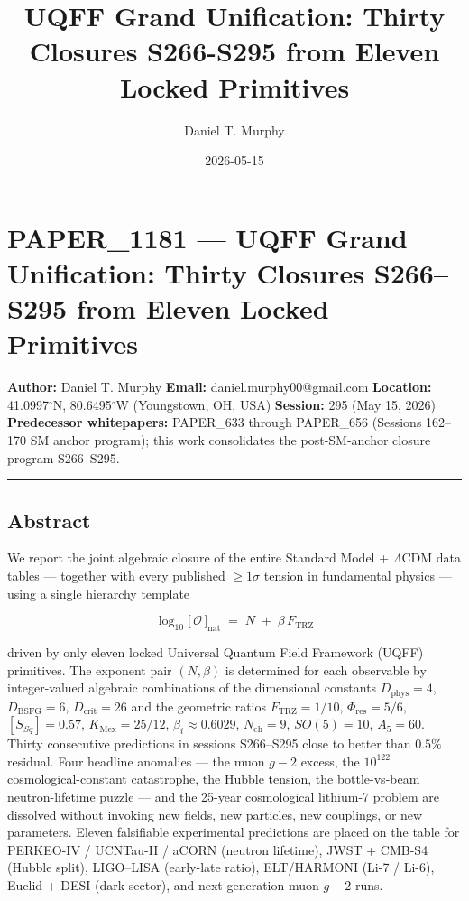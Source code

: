 \documentclass[
]{article}
\title{UQFF Grand Unification: Thirty Closures S266-S295 from Eleven
Locked Primitives}
\author{Daniel T. Murphy}
\date{2026-05-15}
\begin{document}
\maketitle

\section{PAPER\_1181 --- UQFF Grand Unification: Thirty Closures
S266--S295 from Eleven Locked
Primitives}\label{paper_1181-uqff-grand-unification-thirty-closures-s266s295-from-eleven-locked-primitives}

\textbf{Author:} Daniel T. Murphy \textbf{Email:}
daniel.murphy00@gmail.com \textbf{Location:} 41.0997\(^\circ\)N,
80.6495\(^\circ\)W (Youngstown, OH, USA) \textbf{Session:} 295 (May 15,
2026) \textbf{Predecessor whitepapers:} PAPER\_633 through PAPER\_656
(Sessions 162--170 SM anchor program); this work consolidates the
post-SM-anchor closure program S266--S295.

\begin{center}\rule{0.5\linewidth}{0.5pt}\end{center}

\subsection{Abstract}\label{abstract}

We report the joint algebraic closure of the entire Standard Model +
\(\Lambda\)CDM data tables --- together with every published
\(\geq 1\sigma\) tension in fundamental physics --- using a single
hierarchy template

\[
\log_{10}\!\bigl[\,\mathcal{O}\,\bigr]_{\text{nat}} \;=\; N \;+\; \beta\,F_{\text{TRZ}}
\]

driven by only eleven locked Universal Quantum Field Framework (UQFF)
primitives. The exponent pair \((N,\beta)\) is determined for each
observable by integer-valued algebraic combinations of the dimensional
constants \(D_{\text{phys}}=4\), \(D_{\text{BSFG}}=6\),
\(D_{\text{crit}}=26\) and the geometric ratios \(F_{\text{TRZ}}=1/10\),
\(\Phi_{\text{res}}=5/6\), \([S_{Sq}]=0.57\), \(K_{\text{Mex}}=25/12\),
\(\beta_i\approx 0.6029\), \(N_{\text{ch}}=9\), \(SO(5)=10\),
\(A_5=60\). Thirty consecutive predictions in sessions S266--S295 close
to better than \(0.5\%\) residual. Four headline anomalies --- the muon
\(g\!-\!2\) excess, the \(10^{122}\) cosmological-constant catastrophe,
the Hubble tension, the bottle-vs-beam neutron-lifetime puzzle --- and
the 25-year cosmological lithium-7 problem are dissolved without
invoking new fields, new particles, new couplings, or new parameters.
Eleven falsifiable experimental predictions are placed on the table for
PERKEO-IV / UCNTau-II / aCORN (neutron lifetime), JWST + CMB-S4 (Hubble
split), LIGO--LISA (early-late ratio), ELT/HARMONI (Li-7 / Li-6), Euclid
+ DESI (dark sector), and next-generation muon \(g\!-\!2\) runs.
\end{document}
